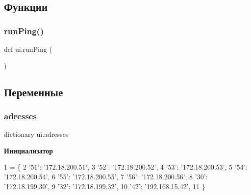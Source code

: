 \subsection{Функции}
\mbox{\label{namespaceui_ad062c21e9583db1aef2026bda2bfd294}} 
\subsubsection{\texorpdfstring{run\+Ping()}{runPing()}}
{\footnotesize\ttfamily def ui.\+run\+Ping (\begin{DoxyParamCaption}{ }\end{DoxyParamCaption})}



\subsection{Переменные}
\mbox{\label{namespaceui_aad45a9db615017fdd003dcd9e271a9b9}} 
\subsubsection{\texorpdfstring{adresses}{adresses}}
{\footnotesize\ttfamily dictionary ui.\+adresses}

{\bfseries Инициализатор}
\begin{DoxyCode}
1 =  \{
2     \textcolor{stringliteral}{'51'}: \textcolor{stringliteral}{'172.18.200.51'},
3     \textcolor{stringliteral}{'52'}: \textcolor{stringliteral}{'172.18.200.52'},
4     \textcolor{stringliteral}{'53'}: \textcolor{stringliteral}{'172.18.200.53'},
5     \textcolor{stringliteral}{'54'}: \textcolor{stringliteral}{'172.18.200.54'},
6     \textcolor{stringliteral}{'55'}: \textcolor{stringliteral}{'172.18.200.55'},
7     \textcolor{stringliteral}{'56'}: \textcolor{stringliteral}{'172.18.200.56'},
8     \textcolor{stringliteral}{'30'}: \textcolor{stringliteral}{'172.18.199.30'},
9     \textcolor{stringliteral}{'32'}: \textcolor{stringliteral}{'172.18.199.32'},
10     \textcolor{stringliteral}{'42'}: \textcolor{stringliteral}{'192.168.15.42'},   
11 \}
\end{DoxyCode}
\mbox{\label{namespaceui_adc51f403edb0c2ba24343024b93644b0}} 
